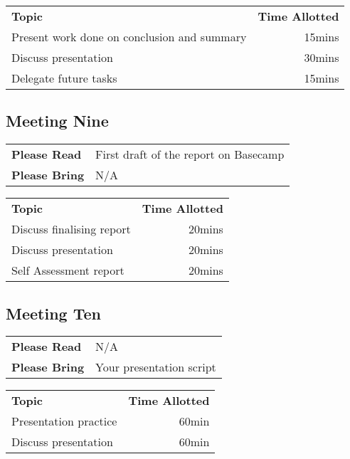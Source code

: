 \vspace{5mm}

\begin{tabularx}{\textwidth}{X r}
  \textbf{Topic} & \textbf{Time Allotted} \\
 
 Present work done on conclusion and summary &
15mins \\
 
Discuss presentation &
30mins \\
 
Delegate future tasks &
15mins \\
 
\end{tabularx}

\subsection{Meeting Nine}

\begin{tabularx}{\textwidth}{l X}
  \textbf{Please Read} & First draft of the report on Basecamp
 \\
  \textbf{Please Bring} & N/A \\
\end{tabularx}

\vspace{5mm}

\begin{tabularx}{\textwidth}{X r}
  \textbf{Topic} & \textbf{Time Allotted} \\
 
 Discuss finalising report &
20mins \\
 
Discuss presentation &
20mins \\
 
Self Assessment report &
20mins \\
 
\end{tabularx}

\subsection{Meeting Ten}

\begin{tabularx}{\textwidth}{l X}
  \textbf{Please Read} & N/A
 \\
  \textbf{Please Bring} & Your presentation script \\
\end{tabularx}

\vspace{5mm}

\begin{tabularx}{\textwidth}{X r}
  \textbf{Topic} & \textbf{Time Allotted} \\
 
Presentation practice & 60min \\

Discuss presentation & 60min \\ 
 
\end{tabularx}
